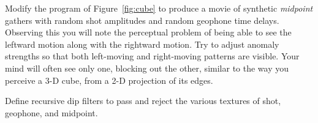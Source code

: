 \begin{exer}

\item
Modify the program of Figure~\ref{fig:cube} to produce a movie
of synthetic %
{\em midpoint %
} gathers
with random shot amplitudes and random geophone time delays.
Observing this  you will note the perceptual problem of being
able to see the leftward motion along with the rightward motion.
Try to adjust anomaly strengths so that both left-moving
and right-moving patterns are visible.
Your mind will often see only one,
blocking out the other,
similar to the way you perceive a 3-D cube,
from a 2-D projection of its edges.
\item
Define recursive dip filters to pass and reject the
various textures of shot, geophone, and midpoint.
\end{exer}
















